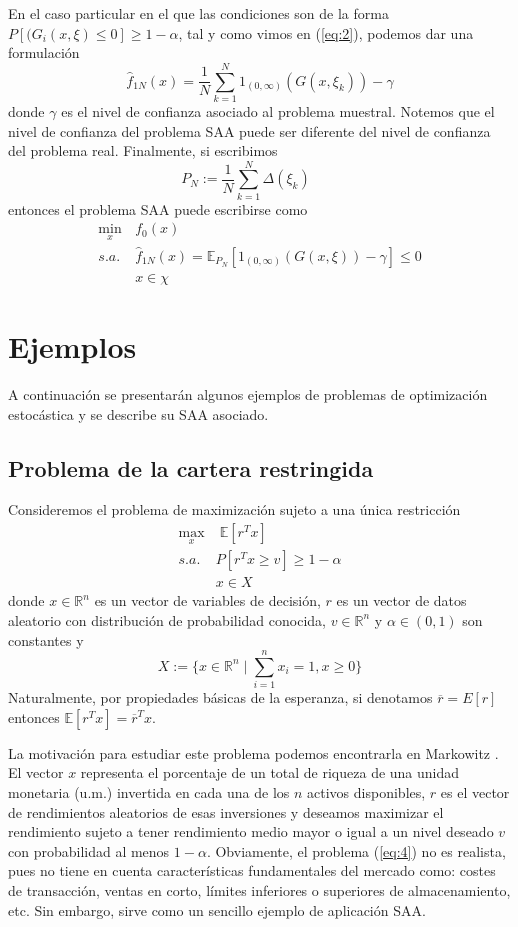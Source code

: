 \documentclass[twoside,a4paper,openright,12pt]{book}
\newcommand{\R}{\mathbb{R}}
\newcommand{\E}{\mathbb{E}}
\begin{document}
En el caso particular en el que las condiciones son de la forma $P[(G_i(x,\xi)\leq 0]\geq 1-\alpha$, tal y como vimos en (\ref{eq:2}), podemos dar una formulación 
$$
\hat{f}_{1N}(x) =\frac{1}{N}\sum_{k=1}^N 1_{(0,\infty)}(G(x,\xi_k))  -\gamma
$$
donde $\gamma$ es el nivel de confianza asociado al problema muestral. Notemos que el nivel de confianza del problema SAA puede ser diferente del nivel de confianza del problema real. Finalmente, si escribimos
$$
P_N:=\frac{1}{N}\sum_{k=1}^N \Delta(\xi_k) \qquad 
$$
entonces el problema SAA puede escribirse como
\begin{align*}
\min_{x} &f_0(x)  \nonumber\\ 
s.a.\;  & \hat{f}_{1N} (x) = \E_{P_N}[1_{(0,\infty)}(G(x,\xi))  -\gamma]\leq 0\\
& x\in\chi \nonumber
\end{align*}
\newpage
\section{Ejemplos}\label{sec:unotres}
A continuación se presentarán algunos ejemplos de problemas de optimización estocástica y se describe su SAA asociado.
\subsection{Problema de la cartera restringida}
Consideremos el problema de maximización sujeto a una única restricción
\begin{align*}
\max_{x} &\;\E[r^Tx] \\ 
s.a.\;  &  P[r^Tx\geq v]\geq 1-\alpha \tag{4} \label{eq:4}\\
& x\in X
\end{align*}
donde $x\in\R^n$ es un vector de variables de decisión, $r$ es un vector de datos aleatorio con distribución de probabilidad conocida, $v\in\R^n$ y $\alpha\in(0,1)$ son constantes y
$$
X:=\{x\in\R^n \mid \sum_{i=1}^n x_i=1,x\geq 0\}
$$
Naturalmente, por propiedades básicas de la esperanza, si denotamos $\overline{r}= E[r]$ entonces $\E[r^Tx]=\overline{r}^Tx$.

La motivación para estudiar este problema podemos encontrarla en Markowitz \cite{portfolio}. El vector $x$ representa el porcentaje de un total de riqueza de una unidad monetaria (u.m.) invertida en cada una de los $n$ activos disponibles, $r$ es el vector de rendimientos aleatorios de esas inversiones y deseamos maximizar el rendimiento sujeto a tener rendimiento medio mayor o igual a un nivel deseado $v$ con probabilidad al menos $1-\alpha$. Obviamente, el problema (\ref{eq:4}) no es realista, pues no tiene en cuenta características fundamentales del mercado como: costes de transacción, ventas en corto, límites inferiores o superiores de almacenamiento, etc. Sin embargo, sirve como un sencillo ejemplo de aplicación SAA.
\end{document}
